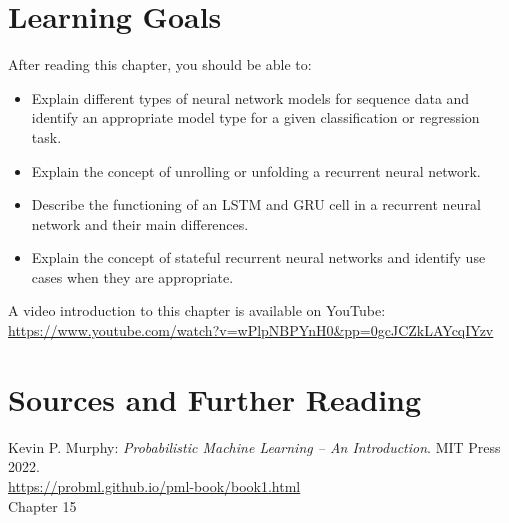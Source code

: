 %
%
\section*{Learning Goals}

After reading this chapter, you should be able to:
\begin{itemize}
   \item Explain different types of neural network models for sequence data and identify an appropriate model type for a given classification or regression task. 
   \item Explain the concept of unrolling or unfolding a recurrent neural network.
   \item Describe the functioning of an LSTM and GRU cell in a recurrent neural network and their main differences. 
   \item Explain the concept of stateful recurrent neural networks and identify use cases when they are appropriate.
\end{itemize}


\begin{advanced}
\begin{videobox}
A video introduction to this chapter is available on YouTube:\\

\url{https://www.youtube.com/watch?v=wPlpNBPYnH0&pp=0gcJCZkLAYcqIYzv}
\end{videobox}
\end{advanced}


\section*{Sources and Further Reading}

\begin{resourcebox}
Kevin P. Murphy: \emph{Probabilistic Machine Learning -- An Introduction}. MIT Press 2022. \\

\small\url{https://probml.github.io/pml-book/book1.html}\normalsize \\

Chapter 15
\end{resourcebox}

